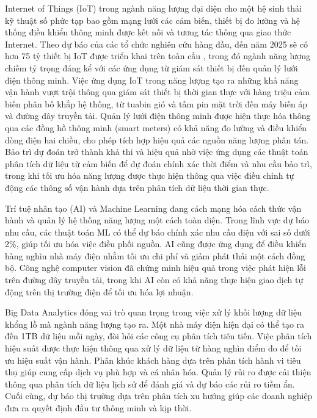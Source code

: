 \documentclass[../main.tex]{subfiles}
\begin{document}
Internet of Things (IoT) trong ngành năng lượng đại diện cho một hệ sinh thái kỹ thuật số phức tạp bao gồm mạng lưới các cảm biến, thiết bị đo lường và hệ thống điều khiển thông minh được kết nối và tương tác thông qua giao thức Internet. Theo dự báo của các tổ chức nghiên cứu hàng đầu, đến năm 2025 sẽ có hơn 75 tỷ thiết bị IoT được triển khai trên toàn cầu \cite{statista2023iot}, trong đó ngành năng lượng chiếm tỷ trọng đáng kể với các ứng dụng từ giám sát thiết bị đến quản lý lưới điện thông minh. Việc ứng dụng IoT trong năng lượng tạo ra những khả năng vận hành vượt trội thông qua giám sát thiết bị thời gian thực với hàng triệu cảm biến phân bố khắp hệ thống, từ tuabin gió và tấm pin mặt trời đến máy biến áp và đường dây truyền tải. Quản lý lưới điện thông minh được hiện thực hóa thông qua các đồng hồ thông minh (smart meters) có khả năng đo lường và điều khiển dòng điện hai chiều, cho phép tích hợp hiệu quả các nguồn năng lượng phân tán. Bảo trì dự đoán trở thành khả thi và hiệu quả nhờ việc ứng dụng các thuật toán phân tích dữ liệu từ cảm biến để dự đoán chính xác thời điểm và nhu cầu bảo trì, trong khi tối ưu hóa năng lượng được thực hiện thông qua việc điều chỉnh tự động các thông số vận hành dựa trên phân tích dữ liệu thời gian thực.

Trí tuệ nhân tạo (AI) và Machine Learning đang cách mạng hóa cách thức vận hành và quản lý hệ thống năng lượng một cách toàn diện. Trong lĩnh vực dự báo nhu cầu, các thuật toán ML có thể dự báo chính xác nhu cầu điện với sai số dưới 2\%, giúp tối ưu hóa việc điều phối nguồn. AI cũng được ứng dụng để điều khiển hàng nghìn nhà máy điện nhằm tối ưu chi phí và giảm phát thải một cách đồng bộ. Công nghệ computer vision đã chứng minh hiệu quả trong việc phát hiện lỗi trên đường dây truyền tải, trong khi AI còn có khả năng thực hiện giao dịch tự động trên thị trường điện để tối ưu hóa lợi nhuận.

Big Data Analytics đóng vai trò quan trọng trong việc xử lý khối lượng dữ liệu khổng lồ mà ngành năng lượng tạo ra. Một nhà máy điện hiện đại có thể tạo ra đến 1TB dữ liệu mỗi ngày, đòi hỏi các công cụ phân tích tiên tiến. Việc phân tích hiệu suất được thực hiện thông qua xử lý dữ liệu từ hàng nghìn điểm đo để tối ưu hiệu suất vận hành. Phân khúc khách hàng dựa trên phân tích hành vi tiêu thụ giúp cung cấp dịch vụ phù hợp và cá nhân hóa. Quản lý rủi ro được cải thiện thông qua phân tích dữ liệu lịch sử để đánh giá và dự báo các rủi ro tiềm ẩn. Cuối cùng, dự báo thị trường dựa trên phân tích xu hướng giúp các doanh nghiệp đưa ra quyết định đầu tư thông minh và kịp thời.
\end{document}
